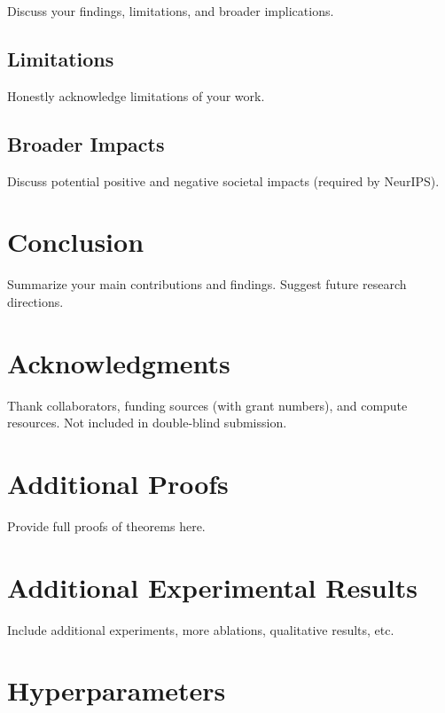 \documentclass{article}
\begin{document}
Discuss your findings, limitations, and broader implications.

\subsection{Limitations}
Honestly acknowledge limitations of your work.

\subsection{Broader Impacts}
Discuss potential positive and negative societal impacts (required by NeurIPS).

\section{Conclusion}
\label{sec:conclusion}

Summarize your main contributions and findings. Suggest future research directions.

\section*{Acknowledgments}
Thank collaborators, funding sources (with grant numbers), and compute resources. Not included in double-blind submission.


\appendix

\section{Additional Proofs}
\label{app:proofs}

Provide full proofs of theorems here.

\section{Additional Experimental Results}
\label{app:experiments}

Include additional experiments, more ablations, qualitative results, etc.

\section{Hyperparameters}
\label{app:hyperparameters}
\end{document}
